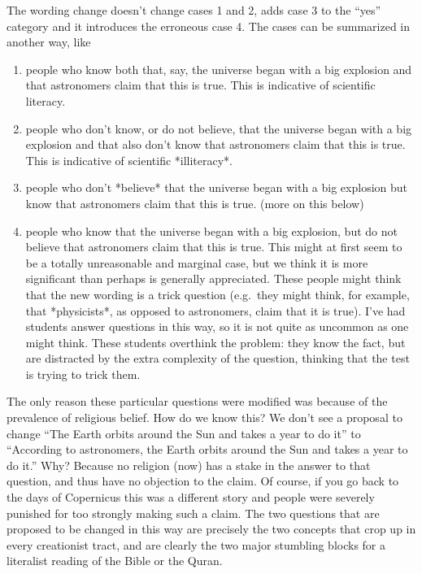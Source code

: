 \documentclass{tufte-book}
\begin{document}
The wording change doesn't change cases 1 and 2, adds case 3 to the
``yes'' category and it introduces the erroneous case 4. The cases can
be summarized in another way, like

\begin{enumerate}
\def\labelenumi{\arabic{enumi}.}
\itemsep1pt\parskip0pt
\item
  people who know both that, say, the universe began with a big
  explosion and that astronomers claim that this is true. This is
  indicative of scientific literacy.
\item
  people who don't know, or do not believe, that the universe began with
  a big explosion and that also don't know that astronomers claim that this
  is true. This is indicative of scientific *illiteracy*.
\item
  people who don't *believe* that the universe began with a big
  explosion but know that astronomers claim that this is true. (more on
  this below)
\item
  people who know that the universe began with a big explosion, but do
  not believe that astronomers claim that this is true. This might at
  first seem to be a totally unreasonable and marginal case, but we think
  it is more significant than perhaps is generally appreciated. These
  people might think that the new wording is a trick question (e.g.~they
  might think, for example, that *physicists*, as opposed to astronomers, claim
  that it is true). I've had students answer questions in this way, so
  it is not quite as uncommon as one might think. These students
  overthink the problem: they know the fact, but are distracted by the
  extra complexity of the question, thinking that the test is trying to
  trick them.
\end{enumerate}

The only reason these particular questions were modified was because of
the prevalence of religious belief. How do we know this? We don't see a
proposal to change ``The Earth orbits around the Sun and takes a year to
do it'' to ``According to astronomers, the Earth orbits around the Sun
and takes a year to do it.'' Why? Because no religion (now) has a stake
in the answer to that question, and thus have no objection to the claim.
Of course, if you go back to the days of Copernicus this was a different
story and people were severely punished for too strongly making such a
claim. The two questions that are proposed to be changed in this way are
precisely the two concepts that crop up in every creationist tract, and
are clearly the two major stumbling blocks for a literalist reading of
the Bible or the Quran.
\end{document}
